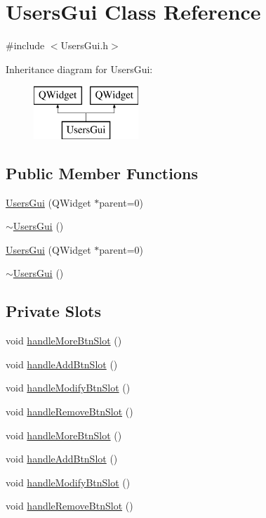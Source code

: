 \hypertarget{class_users_gui}{\section{Users\-Gui Class Reference}
\label{class_users_gui}
}


{\ttfamily \#include $<$Users\-Gui.\-h$>$}

Inheritance diagram for Users\-Gui\-:\begin{figure}[H]
\begin{center}
\leavevmode
\includegraphics[height=2.000000cm]{class_users_gui}
\end{center}
\end{figure}
\subsection*{Public Member Functions}
\begin{DoxyCompactItemize}
\item 
\hyperlink{class_users_gui_a64cd4b0acf274867531462f722feb1d2}{Users\-Gui} (Q\-Widget $\ast$parent=0)
\item 
\hyperlink{class_users_gui_ab63a5de3f270ec77c4d51cad5ed66889}{$\sim$\-Users\-Gui} ()
\item 
\hyperlink{class_users_gui_a64cd4b0acf274867531462f722feb1d2}{Users\-Gui} (Q\-Widget $\ast$parent=0)
\item 
\hyperlink{class_users_gui_ab63a5de3f270ec77c4d51cad5ed66889}{$\sim$\-Users\-Gui} ()
\end{DoxyCompactItemize}
\subsection*{Private Slots}
\begin{DoxyCompactItemize}
\item 
void \hyperlink{class_users_gui_a9226c99e3c835a5b87a134653f9e7412}{handle\-More\-Btn\-Slot} ()
\item 
void \hyperlink{class_users_gui_a443b2c44b294d6b8caa31f6164a7af9a}{handle\-Add\-Btn\-Slot} ()
\item 
void \hyperlink{class_users_gui_ac52e840c12ea6960dbdab01f7237b4b9}{handle\-Modify\-Btn\-Slot} ()
\item 
void \hyperlink{class_users_gui_a65b9c26cc5fd5d7bb17d299182fb8880}{handle\-Remove\-Btn\-Slot} ()
\item 
void \hyperlink{class_users_gui_a9226c99e3c835a5b87a134653f9e7412}{handle\-More\-Btn\-Slot} ()
\item 
void \hyperlink{class_users_gui_a443b2c44b294d6b8caa31f6164a7af9a}{handle\-Add\-Btn\-Slot} ()
\item 
void \hyperlink{class_users_gui_ac52e840c12ea6960dbdab01f7237b4b9}{handle\-Modify\-Btn\-Slot} ()
\item 
void \hyperlink{class_users_gui_a65b9c26cc5fd5d7bb17d299182fb8880}{handle\-Remove\-Btn\-Slot} ()
\end{DoxyCompactItemize}
